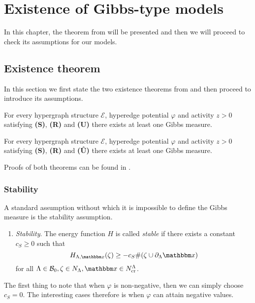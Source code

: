 \chapter{Existence of Gibbs-type models}\label{ch:3}
In this chapter, the theorem from \cite{DL07} will be presented and then we will proceed to check its assumptions for our models.

\section{Existence theorem}
In this section we first state the two existence theorems from \cite{DL07} and then proceed to introduce its assumptions.

\begin{theorem}
	For every hypergraph structure $\mathcal E$, hyperedge potential $\varphi$ and activity $z>0$ satisfying \textbf{(S)}, \textbf{(R)} and \textbf{(U)} there exists at least one Gibbs measure.
\end{theorem}

\begin{theorem}
	For every hypergraph structure $\mathcal E$, hyperedge potential $\varphi$ and activity $z>0$ satisfying \textbf{(S)}, \textbf{(R)} and \textbf{(\^{U})} there exists at least one Gibbs measure.
\end{theorem}

Proofs of both theorems can be found in \cite{DL07}.

\subsection{Stability}
A standard assumption without which it is impossible to define the Gibbs measure is the stability assumption.

\begin{enumerate}[\textbf{(S)}] 
	\item \textit{Stability}. The energy function $H$ is called \textit{stable} if there exists a constant $c_S \geq 0$ such that 
$$H_{\Lambda,\x}(\zeta) \geq -c_S \#(\zeta \cup \partial_\Lambda \x)$$
for all $\Lambda \in \mathcal B_0, \zeta \in N_\Lambda, \x \in N^\Lambda_{\text{cr}}$.
\end{enumerate}


The first thing to note that when $\varphi$ is non-negative, then we can simply choose $c_S = 0$. The interesting cases therefore is when $\varphi$ can attain negative values.\newline

